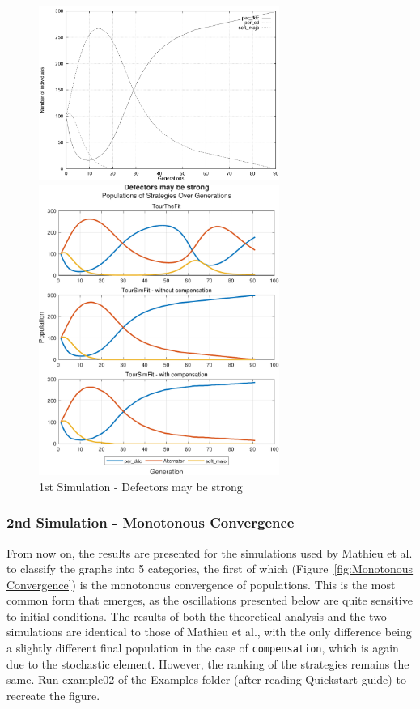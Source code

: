 \documentclass[12pt]{article}
\begin{document}
	\begin{figure}[h]
		\centering
		\includegraphics[width=0.7\textwidth]{RefPaperFigures/fig1.jpeg}\par\vspace{0.5em}
		\includegraphics[width=0.7\textwidth]{Defectors may be strong.pdf}
	    \caption{1st Simulation - Defectors may be strong}
	    \label{fig:Defectors may be strong}
	\end{figure}
\subsubsection{2nd Simulation - Monotonous Convergence}
From now on, the results are presented for the simulations used by Mathieu et al. to classify the graphs into 5 categories, the first of which (Figure~\ref{fig:Monotonous Convergence}) is the monotonous convergence of populations. This is the most common form that emerges, as the oscillations presented below are quite sensitive to initial conditions. The results of both the theoretical analysis and the two simulations are identical to those of Mathieu et al., with the only difference being a slightly different final population in the case of \texttt{compensation}, which is again due to the stochastic element. However, the ranking of the strategies remains the same. Run example02 of the Examples folder (after reading Quickstart guide) to recreate the figure.
\end{document}
